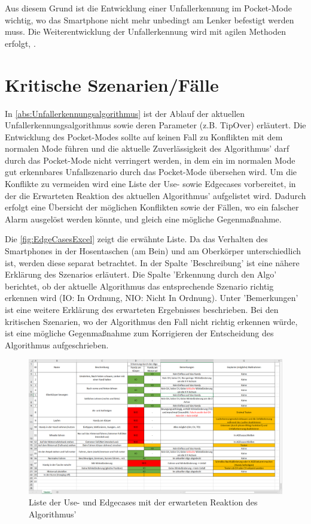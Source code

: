 Aus diesem Grund ist die Entwicklung einer Unfallerkennung im Pocket-Mode wichtig, wo das Smartphone nicht mehr unbedingt am Lenker befestigt werden muss. Die Weiterentwicklung der Unfallerkennung wird mit agilen Methoden erfolgt, .

\section{Kritische Szenarien/Fälle}
In \autoref{abs:Unfallerkennungsalgorithmus} ist der Ablauf der aktuellen Unfallerkennungsalgorithmus sowie deren Parameter (z.B. TipOver) erläutert. Die Entwicklung des Pocket-Modes sollte auf keinen Fall zu Konflikten mit dem normalen Mode führen und die aktuelle Zuverlässigkeit des Algorithmus' darf durch das Pocket-Mode nicht verringert werden, in dem ein im normalen Mode gut erkennbares Unfallszenario durch das Pocket-Mode übersehen wird.
Um die Konflikte zu vermeiden wird eine Liste der Use- sowie Edgecases vorbereitet, in der die Erwarteten Reaktion des aktuellen Algorithmus' aufgelistet wird. Dadurch erfolgt eine Übersicht der möglichen Konflikten sowie der Fällen, wo ein falscher Alarm ausgelöst werden könnte, und gleich eine mögliche Gegenmaßnahme.

Die \autoref{fig:EdgeCasesExcel} zeigt die erwähnte Liste. Da das Verhalten des Smartphones in der Hosentaschen (am Bein) und am Oberkörper unterschiedlich ist, werden diese separat betrachtet. In der Spalte 'Beschreibung' ist eine nähere Erklärung des Szenarios erläutert. Die Spalte 'Erkennung durch den Algo' berichtet, ob der aktuelle Algorithmus das entsprechende Szenario richtig erkennen wird (IO: In Ordnung, NIO: Nicht In Ordnung). Unter 'Bemerkungen' ist eine weitere Erklärung des erwarteten Ergebnisses beschrieben. Bei den kritischen Szenarien, wo der Algorithmus den Fall nicht richtig erkennen würde, ist eine mögliche Gegenmaßnahme zum Korrigieren der Entscheidung des Algorithmus aufgeschrieben.

\begin{figure}[H]
	\centering
	\includegraphics[width=\linewidth]{Bilder/EdgeCasesExcel.png}
	\caption{Liste der Use- und Edgecases mit der erwarteten Reaktion des Algorithmus'}
	\label{fig:EdgeCasesExcel}
\end{figure}

